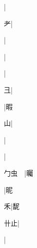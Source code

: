 \begin{multicols}{2}
{{\cjk{}{\cnsym{}　}{\cnsym{}　}{\cnsym{}　}}|{}\par
{耂}|{}\par
{\cjk{}{\cnsym{}　}{\cnsym{}　}{\cnsym{}　}}|{}\par
{\cjk{}{\cnsym{}　}{\cnsym{}　}{\cnsym{}　}}|{}\par
{}|{}\par
{\cjk{}{\cnsym{}　}{\cnsym{}　}彐}|{}\par
{\cjk{}{\cnsym{}　}{\cnsym{}　}{\cnsym{}　}}|{\cjk{}暇}\par
{\cjk{}{\cnsym{}　}{\cnsym{}　}山}|{}\par
{\cjk{}{\cnsym{}　}{\cnsym{}　}{\cnsym{}　}}|{}\par
{\cjk{}{\cnsym{}　}{\cnsym{}　}{\cnsym{}　}}|{}\par
{\cjk{}勹虫{\cnsym{}　}}|{\cjk{}曯}\par
{\cjk{}{\cnsym{}　}{\cnsym{}　}{\cnsym{}　}}|{\cjk{}昵}\par
{\cjk{}{\cnsym{}　}{\cnsym{}　}禾}|{\cjk{}馜}\par
{\cjk{}{\cnsym{}　}卄止}|{}\par
{\cjk{}{\cnsym{}　}{\cnsym{}　}{\cnsym{}　}}|{}\par
}
\end{multicols}
